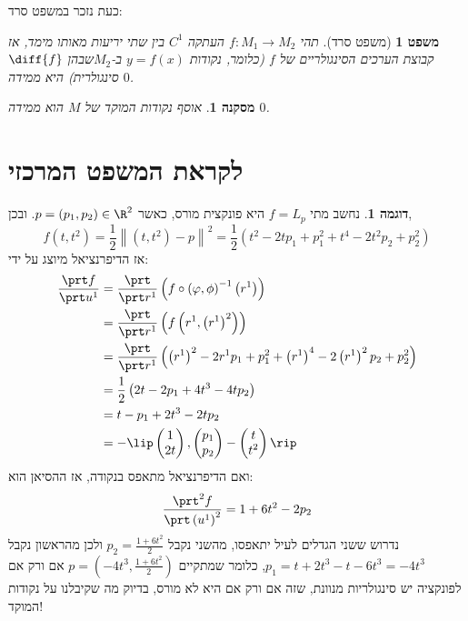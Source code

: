\documentclass{article}
\newtheorem*{corollary*}{מסקנה}
\newtheorem*{theorem*}{משפט}
\theoremstyle{definition}
\newtheorem*{example*}{דוגמה}
\newcommand{\norm}[1]{\left\lVert#1\right\rVert}
\begin{document}
	כעת נזכר במשפט סרד:
	\begin{theorem*}[משפט סרד]
		תהי
		\(f:M_1\to M_2\)
		העתקה
		\(C^1\)
		בין שתי יריעות מאותו מימד,
		אז קבוצת הערכים הסינגולריים של \(f\)
		(כלומר, נקודות \(y=f(x)\) ב-\(M_2\)שבהן \(\diff{f}\) סינגולרית)
		היא ממידה \(0\).
	\end{theorem*}

	\begin{corollary*}
		אוסף נקודות המוקד של \(M\) הוא ממידה \(0\).
	\end{corollary*}




	\section{לקראת המשפט המרכזי}
	\begin{example*}
		נחשב מתי
		\(f=L_p\)
		היא פונקצית מורס, כאשר
		\(p=(p_1,p_2)\in \R^2\).
		ובכן,
		\[
			f(t,t^2)
			=\frac{1}{2}\norm{(t,t^2)-p}^2
			=\frac{1}{2}\left(t^2-2tp_1+p_1^2+t^4-2t^2p_2+p_2^2\right)
		\]
		אז הדיפרנציאל מיוצג על ידי:
		\begin{equation*}\begin{split}
			\frac{\prt f}{\prt u^1}
			&=\frac{\prt}{\prt r^1}\left(f\circ\left(\varphi,\phi\right)^{-1}\left(r^1\right)\right)
			\\&=\frac{\prt}{\prt r^1}\left(f\left(r^1,\left(r^1\right)^2\right)\right)
			\\&=\frac{\prt}{\prt r^1}\left(\left(r^1\right)^2-2r^1 p_1+p_1^2+\left(r^1\right)^4-2\left(r^1\right)^2p_2+p_2^2\right)
			\\&=\frac{1}{2}\left(2t-2p_1+4t^3-4tp_2\right)
			\\&=t-p_1+2t^3-2tp_2
			\\&=-\lip
				\begin{pmatrix}
					1 \\ 2t
				\end{pmatrix},
				\begin{pmatrix}
					p_1 \\ p_2
				\end{pmatrix}
				-\begin{pmatrix}
					t \\ t^2
				\end{pmatrix}
			\rip
		\end{split}\end{equation*}
		ואם הדיפרנציאל מתאפס בנקודה, אז ההסיאן הוא:
		\[
			\frac{\prt^2 f}{\prt \left(u^1\right)^2}
			=1+6t^2-2p_2
		\]
		נדרוש ששני הגדלים לעיל יתאפסו, מהשני נקבל
		\(p_2=\frac{1+6t^2}{2}\)
		ולכן מהראשון נקבל
		\(p_1=t+2t^3-t-6t^3=-4t^3\),
		כלומר שמתקיים
		\(p=\left(-4t^3,\frac{1+6t^2}{2}\right)\)
		אם ורק אם לפונקציה יש סינגולריות מנוונת, שזה אם ורק אם היא לא מורס,
		בדיוק מה שקיבלנו על נקודות המוקד!
	\end{example*}
\end{document}
